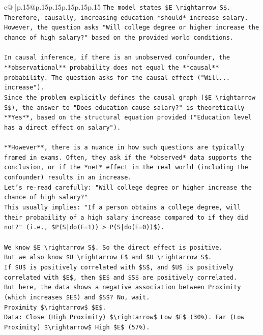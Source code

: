 \documentclass{article}
\begin{document}
{\begin{supertabular}{c@{$\;$}|p{.15\linewidth}@{}p{.15\linewidth}p{.15\linewidth}p{.15\linewidth}p{.15\linewidth}p{.15\linewidth}}
{{{\texttt{The model states \$E \textbackslash{}rightarrow S\$. Therefore, causally, increasing education *should* increase salary. However, the question asks "Will college degree or higher increase the chance of high salary?" based on the provided world conditions.} \\
\\ 
\texttt{In causal inference, if there is an unobserved confounder, the **observational** probability does not equal the **causal** probability. The question asks for the causal effect ("Will... increase").} \\
\texttt{Since the problem explicitly defines the causal graph (\$E \textbackslash{}rightarrow S\$), the answer to "Does education cause salary?" is theoretically **Yes**, based on the structural equation provided ("Education level has a direct effect on salary").} \\
\\ 
\texttt{**However**, there is a nuance in how such questions are typically framed in exams. Often, they ask if the *observed* data supports the conclusion, or if the *net* effect in the real world (including the confounder) results in an increase.} \\
\texttt{Let's re{-}read carefully: "Will college degree or higher increase the chance of high salary?"} \\
\texttt{This usually implies: "If a person obtains a college degree, will their probability of a high salary increase compared to if they did not?" (i.e., \$P(S|do(E=1)) > P(S|do(E=0))\$).} \\
\\ 
\texttt{We know \$E \textbackslash{}rightarrow S\$. So the direct effect is positive.} \\
\texttt{But we also know \$U \textbackslash{}rightarrow E\$ and \$U \textbackslash{}rightarrow S\$.} \\
\texttt{If \$U\$ is positively correlated with \$S\$, and \$U\$ is positively correlated with \$E\$, then \$E\$ and \$S\$ are positively correlated.} \\
\texttt{But here, the data shows a negative association between Proximity (which increases \$E\$) and \$S\$? No, wait.} \\
\texttt{Proximity \$\textbackslash{}rightarrow\$ \$E\$.} \\
\texttt{Data: Close (High Proximity) \$\textbackslash{}rightarrow\$ Low \$E\$ (30\%). Far (Low Proximity) \$\textbackslash{}rightarrow\$ High \$E\$ (57\%).} \\
}}}
\end{supertabular}}
\end{document}
